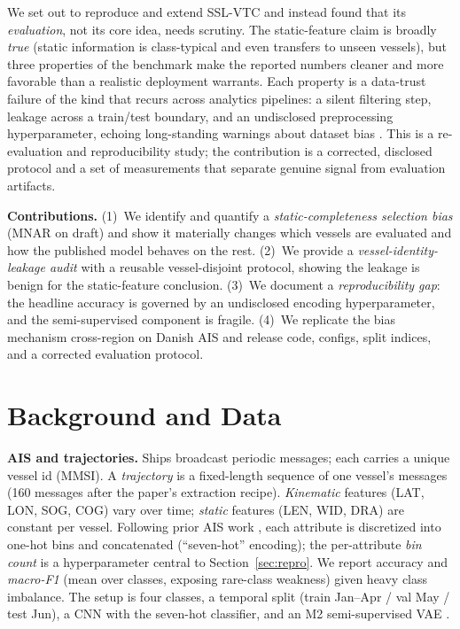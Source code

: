 \documentclass[conference,flushend]{iaria} %
\begin{document}
We set out to reproduce and extend SSL-VTC and instead found that its
\emph{evaluation}, not its core idea, needs scrutiny. The static-feature claim
is broadly \emph{true} (static information is class-typical and even transfers to
unseen vessels), but three properties of the benchmark make the reported numbers
cleaner and more favorable than a realistic deployment warrants. Each property is a
data-trust failure of the kind that recurs across analytics pipelines: a silent
filtering step, leakage across a train/test boundary, and an undisclosed
preprocessing hyperparameter, echoing long-standing warnings about dataset bias
\cite{torralba2011bias}. This is a re-evaluation and reproducibility study; the
contribution is a corrected, disclosed protocol and a set of measurements that
separate genuine signal from evaluation artifacts.

\textbf{Contributions.}
(1)~We identify and quantify a \emph{static-completeness selection bias} (MNAR on
draft) and show it materially changes which vessels are evaluated and how the
published model behaves on the rest.
(2)~We provide a \emph{vessel-identity-leakage audit} with a reusable vessel-disjoint
protocol, showing the leakage is benign for the static-feature conclusion.
(3)~We document a \emph{reproducibility gap}: the headline accuracy is governed by an
undisclosed encoding hyperparameter, and the semi-supervised component is fragile.
(4)~We replicate the bias mechanism cross-region on Danish AIS and release code,
configs, split indices, and a corrected evaluation protocol.

\section{Background and Data}
\textbf{AIS and trajectories.} Ships broadcast periodic messages; each carries a
unique vessel id (MMSI). A \emph{trajectory} is a fixed-length sequence of one
vessel's messages (160 messages after the paper's extraction recipe).
\emph{Kinematic} features (LAT, LON, SOG, COG) vary over time; \emph{static}
features (LEN, WID, DRA) are constant per vessel. Following prior AIS work
\cite{nguyen2018geotracknet,nguyen2024traisformer}, each attribute is discretized
into one-hot bins and concatenated (``seven-hot'' encoding); the per-attribute
\emph{bin count} is a hyperparameter central to Section~\ref{sec:repro}. We report
accuracy and \emph{macro-F1} (mean over classes, exposing rare-class weakness) given
heavy class imbalance. The setup is four classes, a temporal split (train Jan--Apr /
val May / test Jun), a CNN with the seven-hot classifier, and an M2 semi-supervised
VAE \cite{kingma2014m2}.
\end{document}
